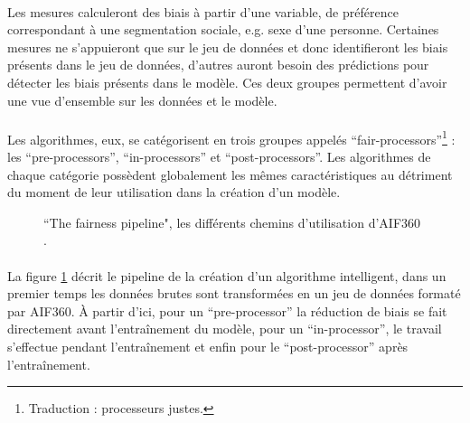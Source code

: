 \documentclass[10pt, french, a4paper]{report}
\begin{document}
\paragraph{}
Les mesures calculeront des biais à partir d’une variable, de préférence correspondant à une segmentation sociale, e.g. sexe d’une personne. Certaines mesures ne s’appuieront que sur le jeu de données et donc identifieront les biais présents dans le jeu de données, d’autres auront besoin des prédictions pour détecter les biais présents dans le modèle. Ces deux groupes permettent d’avoir une vue d’ensemble sur les données et le modèle.

\paragraph{}
Les algorithmes, eux, se catégorisent en trois groupes appelés ``fair-processors''\footnote{Traduction : processeurs justes.} : les ``pre-processors'', ``in-processors'' et ``post-processors''. Les algorithmes de chaque catégorie possèdent globalement les mêmes caractéristiques au détriment du moment de leur utilisation dans la création d’un modèle.

\begin{figure}[hbt!]
  \caption{``The fairness pipeline", les différents chemins d'utilisation d'AIF360 \cite{bellamy_ai_2018}.}
  \label{fig:aif360_pipeline}
\end{figure}

\paragraph{}
La figure \ref{fig:aif360_pipeline} décrit le pipeline de la création d’un algorithme intelligent, dans un premier temps les données brutes sont transformées en un jeu de données formaté par AIF360. À partir d’ici, pour un ``pre-processor'' la réduction de biais se fait directement avant l’entraînement du modèle, pour un ``in-processor'', le travail s’effectue pendant l’entraînement et enfin pour le ``post-processor'' après l’entraînement.
\end{document}
